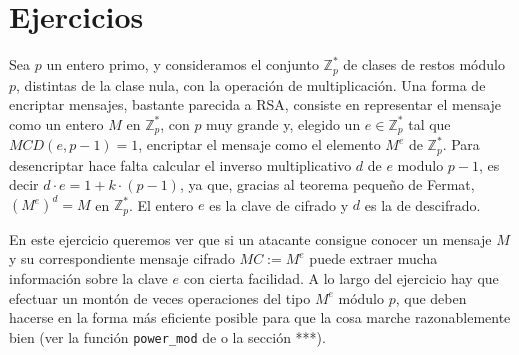 \section{Ejercicios}
 \begin{ejer}
 
 Sea $p$ un entero primo, y consideramos el conjunto $\mathbb{Z}_{p}^{*}$ de
clases de restos m\'odulo $p$, distintas de la clase nula,  con la operaci\'on
de multiplicaci\'on.  Una forma de encriptar mensajes, bastante parecida a RSA,
consiste en representar el mensaje como un entero $M$  en $\mathbb{Z}_{p}^{*}$,
con $p$ muy grande y, elegido un $e \in \mathbb{Z}_{p}^{*}$  tal que 
$MCD(e,p-1)=1$, 
encriptar el mensaje como el elemento $M^e$ de
$\mathbb{Z}_{p}^{*}$.  Para desencriptar hace falta calcular el inverso
multiplicativo $d$ de $e$ modulo $p-1$, es decir $d\cdot e=1+k\cdot(p-1)$,  ya
que,  gracias al teorema pequeño de Fermat,  $(M^e)^d=M$ en
$\mathbb{Z}_{p}^{*}$.  El entero $e$ es la clave de cifrado y $d$ es la de
descifrado.

En este ejercicio queremos ver que si un atacante consigue conocer un mensaje
$M$ y su correspondiente mensaje cifrado $MC:=M^e$   puede extraer mucha
informaci\'on sobre la clave $e$ con cierta facilidad. A lo largo del ejercicio
hay que efectuar un mont\'on de veces operaciones del tipo $M^e$ m\'odulo $p$,
que deben hacerse en la forma m\'as eficiente posible para que la cosa marche
razonablemente bien (ver la funci\'on \lstinline|power_mod| de {\sage} o la
secci\'on ***). 


\end{ejer}
